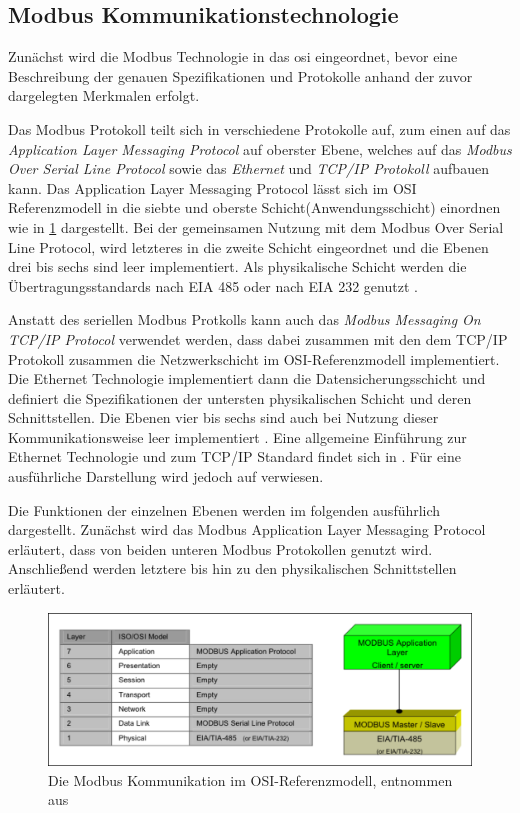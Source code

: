 \subsection{Modbus Kommunikationstechnologie}
\label{sub:modbus}

Zunächst wird die Modbus Technologie in das \acrlong{osi} eingeordnet, bevor eine Beschreibung der genauen Spezifikationen und Protokolle anhand der zuvor dargelegten Merkmalen erfolgt.

Das Modbus Protokoll teilt sich in verschiedene Protokolle auf, zum einen auf das \textit{Application Layer Messaging Protocol} auf oberster Ebene, welches auf das \textit{Modbus Over Serial Line Protocol} sowie das \textit{Ethernet} und \textit{TCP/IP Protokoll} aufbauen kann.
Das Application Layer Messaging Protocol lässt sich im OSI Referenzmodell in die siebte und oberste Schicht(Anwendungsschicht) einordnen wie in \ref{fig:modbusosi} dargestellt. Bei der gemeinsamen Nutzung mit dem Modbus Over Serial Line Protocol, wird letzteres in die zweite Schicht eingeordnet und die Ebenen drei bis sechs sind leer implementiert. Als physikalische Schicht werden die Übertragungsstandards nach EIA 485 oder nach EIA 232 genutzt \cite[S.~2]{mod06ser}.

Anstatt des seriellen Modbus Protkolls kann auch das \textit{Modbus Messaging On TCP/IP Protocol} verwendet werden, dass dabei zusammen mit den dem TCP/IP Protokoll zusammen die Netzwerkschicht im OSI-Referenzmodell implementiert. Die Ethernet Technologie implementiert dann die Datensicherungsschicht und definiert die Spezifikationen der untersten physikalischen Schicht und deren Schnittstellen. Die Ebenen vier bis sechs sind auch bei Nutzung dieser Kommunikationsweise leer implementiert \cite[S.~2f.]{mod12}. Eine allgemeine Einführung zur Ethernet Technologie und zum TCP/IP Standard findet sich in \cite{schn06}. Für eine ausführliche Darstellung wird jedoch auf \cite{fu03} verwiesen.

Die Funktionen der einzelnen Ebenen werden im folgenden ausführlich dargestellt. Zunächst wird das Modbus Application Layer Messaging Protocol erläutert, dass von beiden unteren Modbus Protokollen genutzt wird. Anschließend werden letztere bis hin zu den physikalischen Schnittstellen erläutert.

\begin{figure}
\centering
\includegraphics[width=\textwidth]{abbildungen/20160319_modbusosi}
\caption[Die Modbus Kommunikation im OSI-Referenzmodell]{Die Modbus Kommunikation im OSI-Referenzmodell, entnommen aus \cite[S.~5]{mod06ser}}
\label{fig:modbusosi}
\end{figure}

